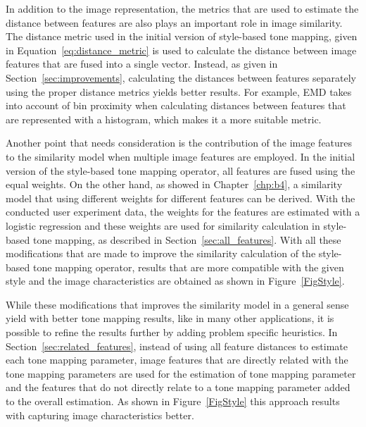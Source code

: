 In addition to the image representation, the metrics that are used to estimate the distance between features are also plays an important role in image similarity. The distance metric used in the initial version of style-based tone mapping, given in Equation~\ref{eq:distance_metric} is used to calculate the distance between image features that are fused into a single vector. Instead, as given in Section~\ref{sec:improvements}, calculating the distances between features separately using the proper distance metrics yields better results. For example, EMD takes into account of bin proximity when calculating distances between features that are represented with a histogram, which makes it a more suitable metric.

Another point that needs consideration is the contribution of the image features to the similarity model when multiple image features are employed. In the initial version of the style-based tone mapping operator, all features are fused using the equal weights. On the other hand, as showed in Chapter~\ref{chp:b4}, a similarity model that using different weights for different features can be derived. With the conducted user experiment data, the weights for the features are estimated with a logistic regression and these weights are used for similarity calculation in style-based tone mapping, as described in Section~\ref{sec:all_features}. With all these modifications that are made to improve the similarity calculation of the style-based tone mapping operator, results that are more compatible with the given style and the image characteristics are obtained as shown in Figure~\ref{FigStyle}. 

While these modifications that improves the similarity model in a general sense yield with better tone mapping results, like in many other applications, it is possible to refine the results further by adding problem specific heuristics. In Section~\ref{sec:related_features}, instead of using all feature distances to estimate each tone mapping parameter, image features that are directly related with the tone mapping parameters are used for the estimation of tone mapping parameter and the features that do not directly relate to a tone mapping parameter added to the overall estimation. As shown in Figure~\ref{FigStyle} this approach results with capturing image characteristics better. 

